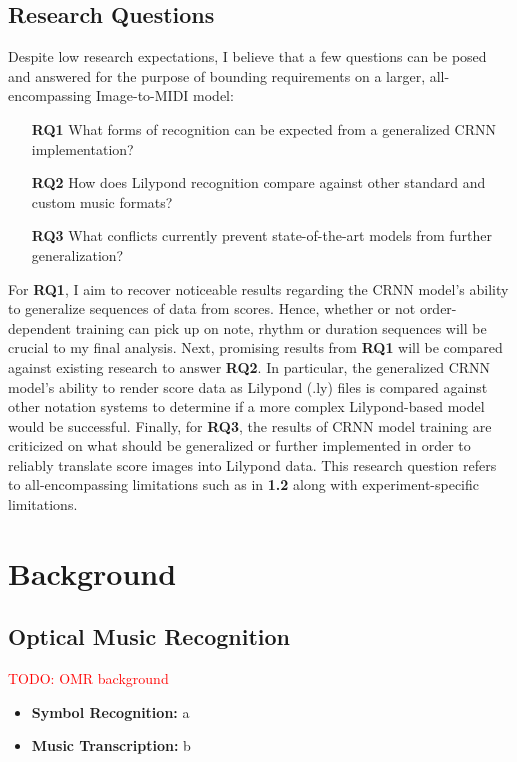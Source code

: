 \documentclass[sigconf]{acmart}
\newcommand{\todo}[1]{\textcolor{red}{TODO: #1}}
\begin{document}
\subsection{Research Questions}

Despite low research expectations, I believe that a few questions can be posed and answered for the purpose of bounding requirements on a larger, all-encompassing Image-to-MIDI model:

\begin{itemize}
	\item [\textbf{RQ1}] What forms of recognition can be expected from a generalized CRNN implementation?
	\item [\textbf{RQ2}] How does Lilypond recognition compare against other standard and custom music formats?
	\item [\textbf{RQ3}] What conflicts currently prevent state-of-the-art models from further generalization?
\end{itemize}

For \textbf{RQ1}, I aim to recover noticeable results regarding the CRNN model's ability to generalize sequences of data from scores.
Hence, whether or not order-dependent training can pick up on note, rhythm or duration sequences will be crucial to my final analysis.
Next, promising results from \textbf{RQ1} will be compared against existing research to answer \textbf{RQ2}. 
In particular, the generalized CRNN model's ability to render score data as Lilypond (.ly) files is compared against other notation systems to determine if a more complex Lilypond-based model would be successful.
Finally, for \textbf{RQ3}, the results of CRNN model training are criticized on what should be generalized or further implemented in order to reliably translate score images into Lilypond data.
This research question refers to all-encompassing limitations such as in \textbf{1.2} along with experiment-specific limitations.

\section{Background}
\subsection{Optical Music Recognition}
\todo{OMR background}

\begin{itemize}
	\item \textbf{Symbol Recognition:} a
	\item \textbf{Music Transcription:} b
\end{itemize}
\end{document}
